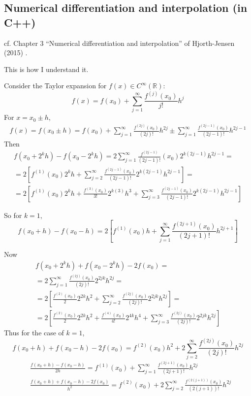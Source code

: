 \documentclass[10pt]{amsart}
\begin{document}
\begin{multicols*}{2}
\subsection{Numerical differentiation and interpolation (in C++)}

cf. Chapter 3 ``Numerical differentiation and interpolation'' of Hjorth-Jensen (2015) \cite{Hjor2015}.

This is how I understand it.

Consider the Taylor expansion for $f(x) \in C^{\infty}(\mathbb{R})$:
\[
f(x) = f(x_0)  + \sum_{j=1}^{\infty} \frac{ f^{(j)}(x_0)}{j!} h^j 
\]
For $x = x_0 \pm h$,
\[
\begin{gathered}
  f(x) = f(x_0 \pm h ) = f(x_0) + \sum_{j=1}^{\infty} \frac{ f^{(2j)}(x_0) }{(2j)!} h^{2j} \pm \sum_{j=1}^{\infty} \frac{ f^{(2j-1)}(x_0) }{(2j-1)!} h^{2j-1}
\end{gathered}
\]
Then
\[
\begin{gathered}
  f(x_0 + 2^kh) - f(x_0 - 2^kh) = 2\sum_{j=1}^{\infty} \frac{ f^{(2j-1)}}{(2j-1)!}(x_0) 2^{k(2j-1)} h^{2j-1} = \\
  = 2\left[ f^{(1)}(x_0) 2^k h + \sum_{j=2}^{\infty} \frac{ f^{(2j-1)}(x_0)}{ (2j-1)!} 2^{k(2j-1)} h^{2j-1} \right] =  \\
  = 2 \left[ f^{(1)}(x_0) 2^k h + \frac{ f^{(3)}(x_0)}{3!} 2^{k(3)} h^3 + \sum_{j=3}^{\infty} \frac{ f^{(2j-1)}(x_0) }{(2j-1)!} 2^{k(2j-1) } h^{2j-1} \right]
\end{gathered}
\]

So for $k=1$,
\[
f(x_0 + h ) - f(x_0 - h ) = 2 \left[ f^{(1)}(x_0)h + \sum_{j=1}^{\infty} \frac{ f^{(2j+1)}(x_0) }{ (2j+1)!} h^{2j+1} \right]
\]

Now
\[
\begin{gathered}
  f(x_0 + 2^kh) + f(x_0 - 2^kh) - 2f(x_0) = \\
  = 2 \sum_{j=1}^{\infty} \frac{ f^{(2j)}(x_0) }{(2j)!} 2^{2jk} h^{2j} = \\
  = 2 \left[ \frac{ f^{(2)}(x_0)}{2} 2^{2k} h^2 + \sum_{j=2}^{\infty} \frac{ f^{(2j)}(x_0) }{ (2j)!} 2^{2jk} h^{2j} \right] = \\
  = 2 \left[ \frac{ f^{(2)}(x_0) }{2} 2^{2k} h^2 + \frac{ f^{(4)}(x_0)}{4!} 2^{4k} h^4 + \sum_{j=3}^{\infty} \frac{ f^{(2j)}(x_0) }{ (2j)!} 2^{2jk} h^{2j} \right]
  \end{gathered}
\]
Thus for the case of $k=1$,
\[
f(x_0 + h )  + f(x_0 - h) - 2f(x_0) = f^{(2)}(x_0)h^2 + 2 \sum_{j=2}^{\infty} \frac{ f^{(2j)}(x_0)}{(2j)!} h^{2j}
\]
\[
\begin{aligned}
  & \frac{ f(x_0 +h) - f(x_0-h) }{ 2h} = f^{(1)}(x_0) + \sum_{j=1}^{\infty} \frac{ f^{(2j+1)}(x_0) }{(2j+1)!}h^{2j} \\ 
  & \frac{ f(x_0 + h) + f(x_0 - h) - 2f(x_0) }{h^2} = f^{(2)}(x_0) + 2\sum_{j=2}^{\infty} \frac{ f^{(2(j+1) ) }(x_0)}{(2(j+1))!} h^{2j}
  \end{aligned}
\]


\end{multicols*}
\end{document}
